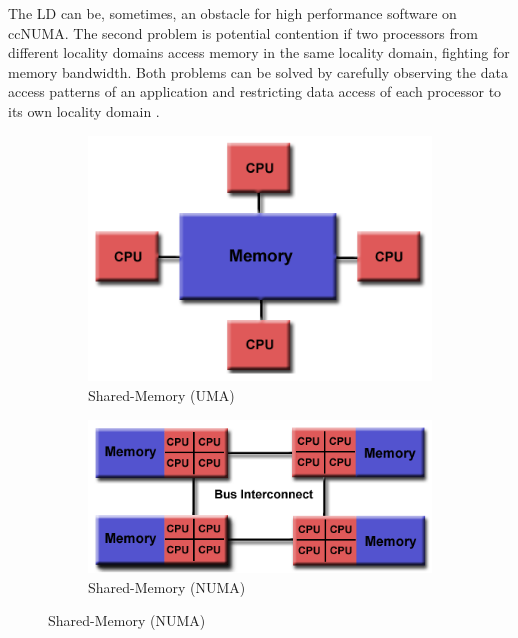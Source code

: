The LD can be, sometimes, an obstacle for high performance software on ccNUMA. The second problem is potential
contention if two processors from different locality domains access memory in the same locality domain, fighting for memory bandwidth. Both problems can be solved by carefully observing the data access patterns of an application and restricting data access of each processor to its own locality domain \cite{Hager2010}.
\begin{figure}[!h]
\centering 
  \begin{subfigure}[b]{0.4\textwidth}
    \includegraphics[width=\textwidth]{images/uma.png}
    \caption{Shared-Memory (UMA)}
    \label{uma}
  \end{subfigure}
  \begin{subfigure}[b]{0.4\textwidth}
    \includegraphics[width=\textwidth]{images/numa.png}
    \caption{Shared-Memory (NUMA)}
    \label{numa}
  \end{subfigure}
\end{figure}
